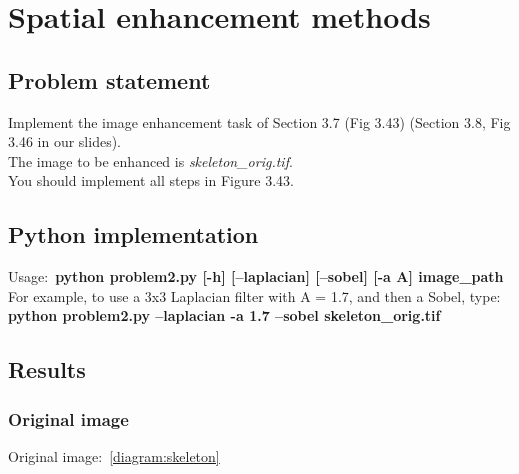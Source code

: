 \chapter{Spatial enhancement methods}

\section{Problem statement}

Implement the image enhancement task of Section 3.7 (Fig 3.43) (Section 3.8, Fig 3.46 in our slides).\\
The image to be enhanced is \textit{skeleton\_orig.tif}.\\
You should implement all steps in Figure 3.43. \\

\section{Python implementation}

Usage:~\textbf{python problem2.py [-h] [--laplacian] [--sobel] [-a A] image\_path} \\

For example, to use a 3x3 Laplacian filter with A = 1.7, and then a Sobel, type:~\\
\textbf{python problem2.py --laplacian -a 1.7 --sobel skeleton\_orig.tif}


\section{Results}

    \subsection{Original image}

    Original image:~\ref{diagram:skeleton}

